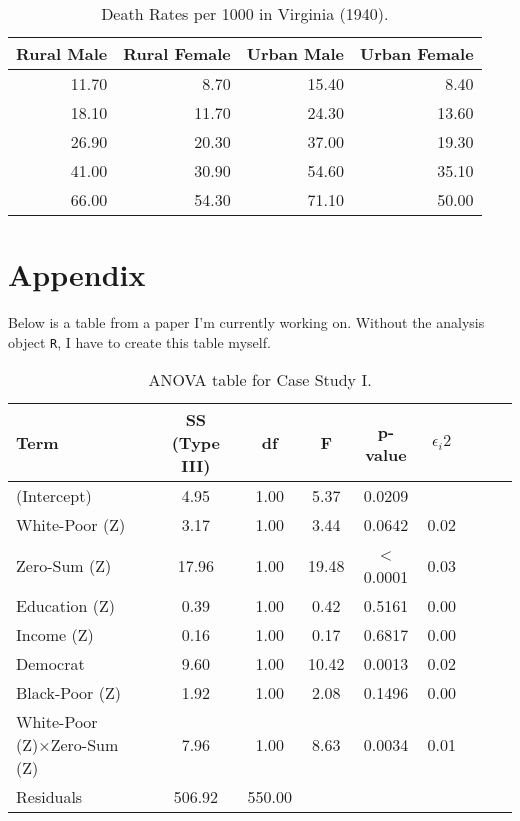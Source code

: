 \documentclass{article}\usepackage[]{graphicx}\usepackage[]{xcolor}
\begin{document}
\begin{multicols}{2}
\begin{table}[H]
\centering
\begingroup\small
\begin{tabular}{rrrr}
  \hline
Rural Male & Rural Female & Urban Male & Urban Female \\ 
  \hline
11.70 & 8.70 & 15.40 & 8.40 \\ 
  18.10 & 11.70 & 24.30 & 13.60 \\ 
  26.90 & 20.30 & 37.00 & 19.30 \\ 
  41.00 & 30.90 & 54.60 & 35.10 \\ 
  66.00 & 54.30 & 71.10 & 50.00 \\ 
   \hline
\end{tabular}
\endgroup
\caption{Death Rates per 1000 in Virginia (1940).} 
\label{VADeaths.tab}
\end{table}


\vspace{2em}
\begin{tiny}

\end{tiny}
\end{multicols}

\pagebreak{}

\section{Appendix}
Below is a table from a paper I'm currently working on. Without the analysis object \texttt{R}, I have to create this table myself.

\begin{table}[H]
\begin{center}
\begin{tabular}{ l  cc  cc  cc  cc |}\\\hline
Term & SS (Type III) & df & F & p-value & $\epsilon_i {2}$ \\\hline
(Intercept) &4.95 &1.00 &5.37 &0.0209 \\
White-Poor (Z) &3.17 &1.00 &3.44 &0.0642 &0.02 \\
Zero-Sum (Z) &17.96 &1.00 &19.48 &< 0.0001 &0.03 \\
Education (Z) &0.39 &1.00 &0.42 &0.5161 &0.00 \\
Income (Z) &0.16 &1.00 &0.17 &0.6817 &0.00 \\
Democrat &9.60 &1.00 &10.42 &0.0013 &0.02 \\
Black-Poor (Z) &1.92 &1.00 &2.08 &0.1496 &0.00 \\
White-Poor (Z)×Zero-Sum (Z) &7.96 &1.00 &8.63 &0.0034 &0.01 \\
Residuals &506.92 &550.00 \\\hline
\end{tabular} \label{full.sleep.tab}
\caption{ANOVA table for Case Study I.}
\end{center}
\end{table}
\end{document}

